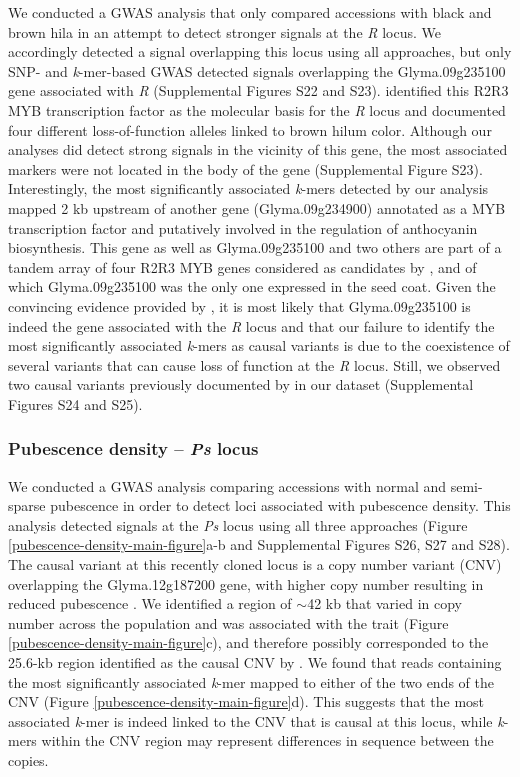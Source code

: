 \documentclass{article}
\begin{document}
We conducted a GWAS analysis that only compared accessions with black and brown
hila in an attempt to detect stronger signals at the \textit{R} locus.  We
accordingly detected a signal overlapping this locus using all approaches, but
only SNP- and \textit{k}-mer-based GWAS detected signals overlapping the
Glyma.09g235100 gene associated with \textit{R} (Supplemental Figures
S22 and S23).
 identified this R2R3 MYB transcription factor as the
molecular basis for the \textit{R} locus and documented four different
loss-of-function alleles linked to brown hilum color. Although our analyses did
detect strong signals in the vicinity of this gene, the most associated markers
were not located in the body of the gene (Supplemental Figure
S23).  Interestingly, the most significantly
associated \emph{k}-mers detected by our analysis mapped 2 kb upstream of
another gene (Glyma.09g234900) annotated as a MYB transcription factor and
putatively involved in the regulation of anthocyanin biosynthesis. This gene as
well as Glyma.09g235100 and two others are part of a tandem array of four R2R3
MYB genes considered as candidates by , and of which
Glyma.09g235100 was the only one expressed in the seed coat. Given the
convincing evidence provided by , it is most likely that
Glyma.09g235100 is indeed the gene associated with the \emph{R} locus and that
our failure to identify the most significantly associated \emph{k}-mers as
causal variants is due to the coexistence of several variants that can cause
loss of function at the \emph{R} locus.  Still, we observed two causal variants
previously documented by  in our dataset (Supplemental Figures
S24 and S25). 

\subsubsection*{Pubescence density -- \textit{Ps} locus}

We conducted a GWAS analysis comparing accessions with normal and semi-sparse
pubes\-cence in order to detect loci associated with pubescence density. This analysis
detected signals at the \textit{Ps} locus using all three approaches (Figure
\ref{pubescence-density-main-figure}a-b and Supplemental Figures S26, S27
and S28). The causal
variant at this recently cloned locus is a copy number variant (CNV) overlapping the
Glyma.12g187200 gene, with higher copy number resulting in reduced pubescence .
We identified a region of $\sim$42 kb that varied in copy number across
the population and was associated with the trait (Figure
\ref{pubescence-density-main-figure}c), and therefore possibly corresponded to the
25.6-kb region identified as the causal CNV by . We found that
reads containing the most significantly associated \textit{k}-mer mapped to either of the two ends
of the CNV (Figure \ref{pubescence-density-main-figure}d). This suggests that
the most associated \textit{k}-mer is indeed linked to the CNV
that is causal at this locus, while \textit{k}-mers within the
CNV region may represent differences in sequence between the copies.
\end{document}
